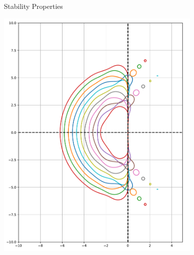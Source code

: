 \documentclass[9pt,compress,t,aspectratio=169]{beamer}
\begin{document}
\begin{frame}{Stability Properties}
\begin{minipage}{0.49\textwidth}
{		\includegraphics[width=0.75\textwidth]{figures/stability/stability_region_DeC_equispaced.pdf}}
	\end{minipage}
	\end{frame}
\end{document}
